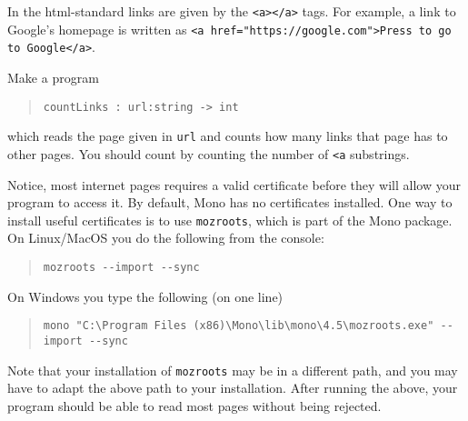 In the html-standard links are given by the \lstinline!<a></a>! tags. For example, a link to Google's homepage is written as \lstinline[language=console]!<a href="https://google.com">Press to go to Google</a>!.

Make a program
  \begin{quote}
    \mbox{\lstinline!countLinks : url:string -> int!}
  \end{quote}
which reads the page given in \lstinline!url! and counts how many links that page has to other pages. You should count by counting the number of \lstinline!<a! substrings.

Notice, most internet pages requires a valid certificate before they will allow your program to access it. By default, Mono has no certificates installed. One way to install useful certificates is to use \lstinline[language=console]{mozroots}, which is part of the Mono package. On Linux/MacOS you do the following from the console:
  \begin{quote}
    \lstinline[language=console]{mozroots --import --sync}
  \end{quote}
On Windows you type the following (on one line)
  \begin{quote}
    \lstinline[language=console]{mono "C:\Program Files (x86)\Mono\lib\mono\4.5\mozroots.exe" --import --sync}
  \end{quote}
Note that your installation of \lstinline[language=console]{mozroots} may be in a different path, and you may have to adapt the above path to your installation. After running the above, your program should be able to read most pages without being rejected.
